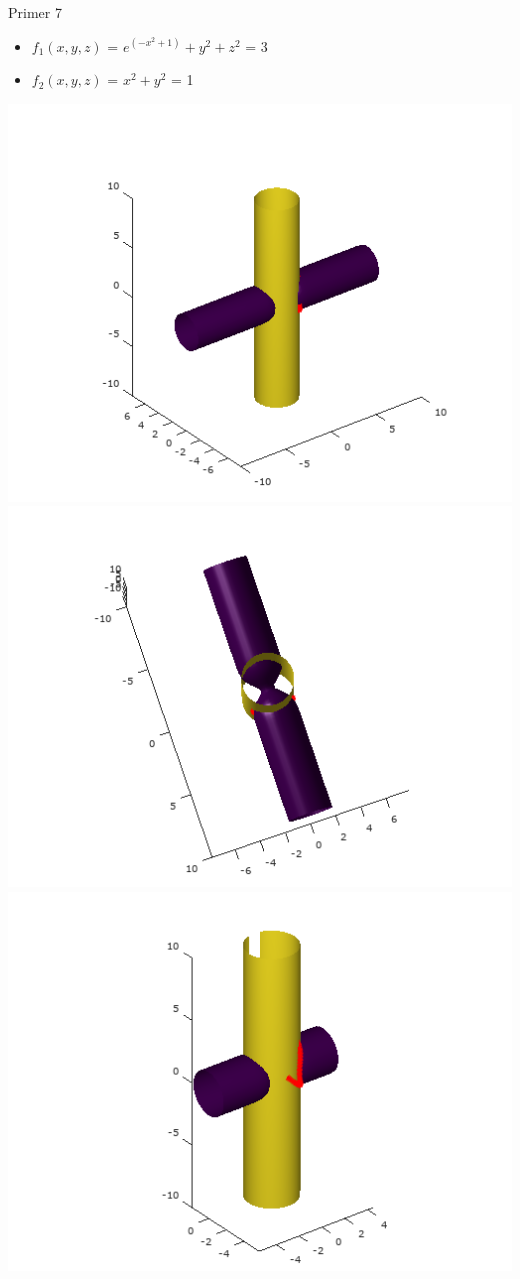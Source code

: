 \documentclass{beamer}
\begin{document}
	\begin{frame}{Primer 7}
		\begin{itemize}  
			\item $f_{1}(x,y,z)$ = $e^{(-x^{2}+1)}+y^{2}+z^{2}$ = 3
			\item $f_{2}(x,y,z)$ =  $x^2 + y^2$ = 1
		\end{itemize} 
		\includegraphics[scale=0.3]{primer7_1}
		\includegraphics[scale=0.3]{primer7_2}
		\includegraphics[scale=0.3]{primer7_3} 
	\end{frame}
\end{document}
